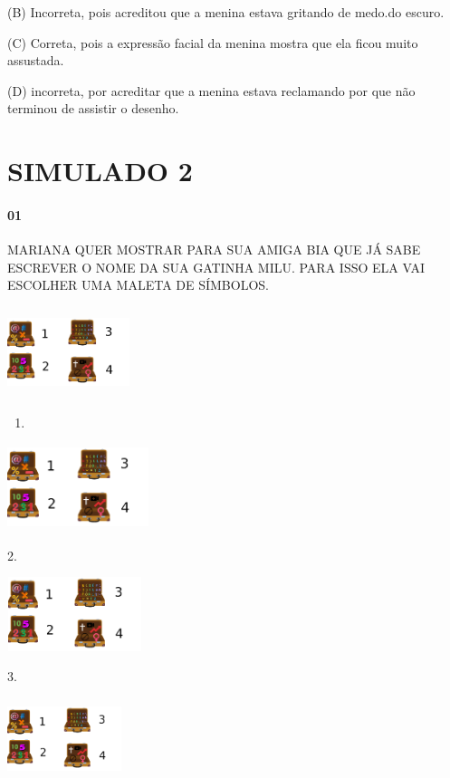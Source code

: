 \begin{escola}
(B) Incorreta, pois acreditou que a menina estava gritando de medo.do
escuro.

(C) Correta, pois a expressão facial da menina mostra que ela ficou
muito assustada.

(D) incorreta, por acreditar que a menina estava reclamando por que não
terminou de assistir o desenho.

\chapter{SIMULADO 2}

\subsubsection{01}\label{section-41}

MARIANA QUER MOSTRAR PARA SUA AMIGA BIA QUE JÁ SABE ESCREVER O NOME DA
SUA GATINHA MILU. PARA ISSO ELA VAI ESCOLHER UMA MALETA DE SÍMBOLOS.

\includegraphics[width=1.40208in,height=1.03194in]{media/image209.png}

\begin{enumerate}
\def\labelenumi{\arabic{enumi}.}
\item
\end{enumerate}

\includegraphics[width=1.62986in,height=0.98819in]{media/image209.png}

2.

\includegraphics[width=1.55139in,height=0.85000in]{media/image209.png}

3.

\includegraphics[width=1.31218in,height=0.92930in]{media/image209.png}


\end{escola}
